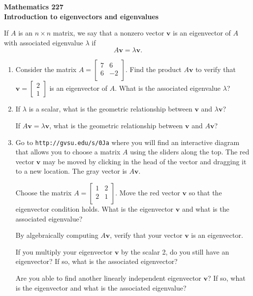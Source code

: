 \documentclass[12pt]{article}
\newcommand{\vs}[1]{\vspace{#1in}}
\newcommand{\vvec}{{\mathbf v}}
\newcommand{\twovec}[2]{\left[\begin{array}{r}#1 \\ #2
    \end{array}\right]}
\begin{document}
\noindent
{\bf Mathematics 227} \\ 
{\bf Introduction to eigenvectors and eigenvalues}

\bigskip
If $A$ is an $n\times n$ matrix, we say that a nonzero vector $\vvec$
is an eigenvector of $A$ with associated eigenvalue $\lambda$ if
$$
A\vvec = \lambda \vvec.
$$

\begin{enumerate}
\item Consider the matrix
  $A =
  \left[
    \begin{array}{cc}
      7 & 6 \\
      6 & -2 \\
    \end{array}
  \right]
  $.  Find the product $A\vvec$ to verify that $\vvec = \twovec21$ is
  an eigenvector of $A$. What is the associated eigenvalue $\lambda$?

  \vs{1.25}
\item If $\lambda$ is a scalar, what is the geometric relationship
  between $\vvec$ and $\lambda\vvec$?

  \vs{1}
  If $A\vvec = \lambda\vvec$, what is the geometric relationship
  between $\vvec$ and $A\vvec$?

  \vs{1}
\item Go to {\tt http://gvsu.edu/s/0Ja} where you will find an
  interactive diagram that allows you to choose a matrix $A$ using the
  sliders along the top.  The red vector $\vvec$ may be moved by
  clicking in the head of the vector and dragging it to a new
  location.  The gray vector is $A\vvec$.

  \medskip
  Choose the matrix
  $A=
  \left[
    \begin{array}{cc}
      1 & 2 \\
      2 & 1 \\
    \end{array}
  \right]
  $.  Move the red vector $\vvec$ so that the eigenvector condition
  holds.  What is the eigenvector $\vvec$ and what is the associated
  eigenvalue?

  \vs{1}
  \newpage
  By algebraically computing $A\vvec$, verify that your vector $\vvec$
  is an eigenvector.

  \vs{1}
  If you multiply your eigenvector $\vvec$ by the scalar 2, do you
  still have an eigenvector?  If so, what is the associated
  eigenvector?

  \vs{1}
  Are you able to find another linearly independent eigenvector
  $\vvec$?  If so, what is the eigenvector and what is the associated
  eigenvalue?


\end{enumerate}
\end{document}
